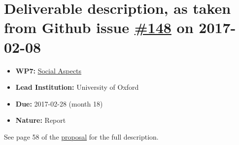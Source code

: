 \section*{\texorpdfstring{Deliverable description, as taken from Github
issue
\href{https://github.com/OpenDreamKit/OpenDreamKit/issues/148}{\#148} on
2017-02-08}{Deliverable description, as taken from Github issue \#148 on 2017-02-08}}\label{deliverable-description-as-taken-from-github-issue-148-on-2017-02-08}

\begin{itemize}
\tightlist
\item
  \textbf{WP7:}
  \href{https://github.com/OpenDreamKit/OpenDreamKit/tree/master/WP7}{Social
  Aspects}
\item
  \textbf{Lead Institution:} University of Oxford
\item
  \textbf{Due:} 2017-02-28 (month 18)
\item
  \textbf{Nature:} Report
\end{itemize}

See page 58 of the
\href{https://github.com/OpenDreamKit/OpenDreamKit/raw/master/Proposal/proposal-www.pdf}{proposal}
for the full description.

